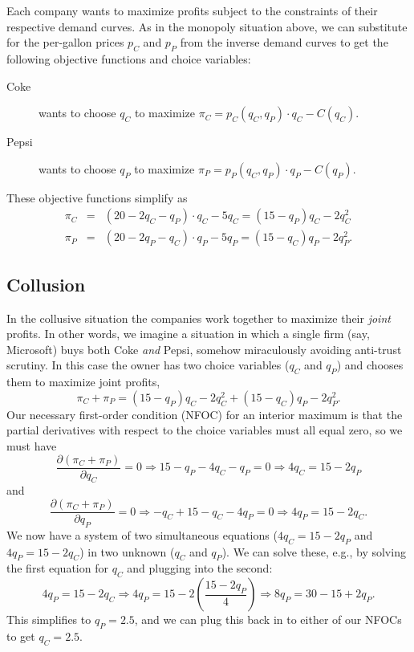 Each company wants to maximize profits subject to the constraints of their respective demand curves. As in the monopoly situation above, we can substitute for the per-gallon prices $p_C$ and $p_P$ from the inverse demand curves to get the following objective functions and choice variables:

\begin{description}
\item[Coke] wants to choose $q_C$ to maximize $\pi_C=p_C(q_C,q_P)\cdot q_C - C(q_C)$.

\item[Pepsi] wants to choose $q_P$ to maximize $\pi_P=p_P(q_C,q_P)\cdot q_P - C(q_P)$.
\end{description}

These objective functions simplify as
\begin{eqnarray*}
\pi_C & = & (20-2q_C-q_P)\cdot q_C - 5q_C = (15-q_P)q_C - 2 q_C^2\\
\pi_P & = & (20-2q_P-q_C)\cdot q_P - 5q_P = (15-q_C)q_P - 2 q_P^2.
\end{eqnarray*}



\subsection*{Collusion}

In the collusive situation the companies work together to maximize their \emph{joint} profits. In other words, we imagine a situation in which a single firm (say, Microsoft) buys both Coke \emph{and} Pepsi, somehow miraculously avoiding anti-trust scrutiny. In this case the owner has two choice variables ($q_C$ and $q_P$) and chooses them to maximize joint profits,
\[
\pi_C+\pi_P = (15-q_P)q_C - 2 q_C^2 + (15-q_C)q_P - 2 q_P^2.
\]
Our necessary first-order condition (NFOC) for an interior maximum is that the partial derivatives with respect to the choice variables must all equal zero, so we must have
\[
\frac{\partial (\pi_C+\pi_P)}{\partial q_C}=0\Longrightarrow 15 -
q_P - 4q_C - q_P = 0\Longrightarrow 4q_C = 15-2q_P
\]
and
\[
\frac{\partial (\pi_C+\pi_P)}{\partial q_P}=0\Longrightarrow -q_C
+ 15 - q_C - 4q_P = 0\Longrightarrow 4q_P = 15-2q_C.
\]
We now have a system of two simultaneous equations ($4q_C = 15-2q_P$ and $4q_P = 15-2q_C$) in two unknown ($q_C$ and $q_P$). We can solve these, e.g., by solving the first equation for $q_C$ and plugging into the second:
\[
4q_P = 15-2q_C\Longrightarrow 4q_P =
15-2\left(\frac{15-2q_P}{4}\right)\Longrightarrow 8q_P = 30 - 15 +
2q_P.
\]
This simplifies to $q_P=2.5$, and we can plug this back in to either of our NFOCs to get $q_C=2.5$.

